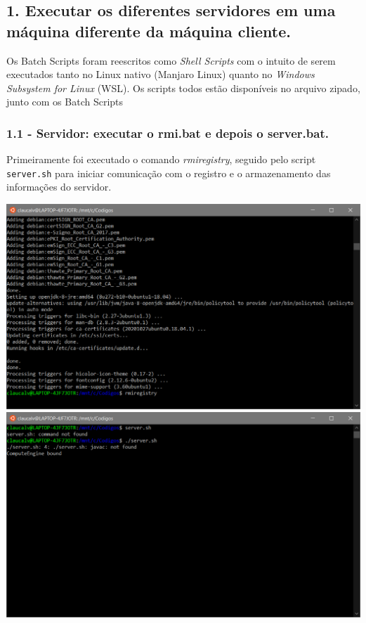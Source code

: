 \subsection*{1. Executar os diferentes servidores em uma máquina diferente da
máquina cliente.}

Os \textit{}{Batch Scripts} foram reescritos como \textit{Shell Scripts} com o intuito de serem executados tanto no Linux nativo (Manjaro Linux) quanto no \textit{Windows Subsystem for Linux} (WSL). Os scripts todos estão disponíveis no arquivo zipado, junto com os Batch Scripts


\subsubsection{1.1 - Servidor: executar o rmi.bat e depois o server.bat.}

Primeiramente foi executado o comando \textit{rmiregistry}, seguido pelo script \texttt{server.sh} para iniciar comunicação com o registro e o armazenamento das informações do servidor.

\vspace{2em}
\begin{minipage}{\textwidth}
    \hspace{-1em}
    \centering
    \includegraphics[scale=.35]{pratica2remover/prints/rmiregistry.PNG}
    \hspace{1em}
    \includegraphics[scale=.35]{pratica2remover/prints/server.PNG}
    \label{threadspng}
    \hspace{1em}
\end{minipage}
\vspace{0.5em}


